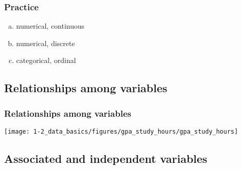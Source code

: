 
\begin{frame}
\frametitle{Practice}


\begin{enumerate}[(a)]
\item numerical, continuous
\item numerical, discrete
\item categorical, ordinal
\end{enumerate}

\end{frame}


\subsection{Relationships among variables}


\begin{frame}
\frametitle{Relationships among variables}


\begin{center}
\texttt{[image: 1-2\_data\_basics/figures/gpa\_study\_hours/gpa\_study\_hours]}
\end{center}

\pause



\end{frame}


\subsection{Associated and independent variables}


